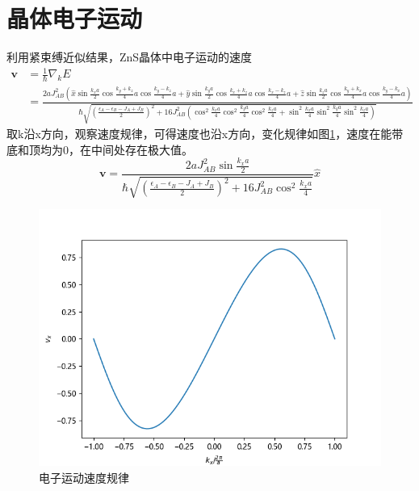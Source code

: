 \documentclass{article}
\begin{document}
\section{晶体电子运动}


利用紧束缚近似结果，ZnS晶体中电子运动的速度
\begin{equation}
	\begin{aligned}
		\boldsymbol{v}&=\frac{1}{\hbar}\nabla_kE\\
		&=\frac{2aJ_{AB}^2(\hat{x}\sin\frac{k_xa}{2}\cos\frac{k_y+k_z}{4}a\cos\frac{k_y-k_z}{4}a + \hat{y}\sin\frac{k_ya}{2}\cos\frac{k_x+k_z}{4}a\cos\frac{k_x-k_z}{4}a + \hat{z}\sin\frac{k_za}{2}\cos\frac{k_y+k_x}{4}a\cos\frac{k_y-k_x}{4}a )} {\hbar \sqrt{(\frac{\epsilon_A-\epsilon_B-J_A+J_B}{2})^2+16J_{AB}^2(\cos^2\frac{k_xa}{4}\cos^2\frac{k_ya}{4}\cos^2\frac{k_za}{4}+\sin^2\frac{k_xa}{4}\sin^2\frac{k_ya}{4}\sin^2\frac{k_za}{4})}}
	\end{aligned}
\end{equation}
取k沿x方向，观察速度规律，可得速度也沿x方向，变化规律如图\ref{fig:9}，速度在能带底和顶均为0，在中间处存在极大值。
\begin{equation}
	\boldsymbol{v}=\frac{2aJ_{AB}^2\sin\frac{k_xa}{2}} {\hbar \sqrt{(\frac{\epsilon_A-\epsilon_B-J_A+J_B}{2})^2+16J_{AB}^2\cos^2\frac{k_xa}{4}}}\hat{x}
\end{equation}
	\begin{figure}[!h]
	\centering
	\includegraphics[scale=1]{v}
	\caption{\heiti{}电子运动速度规律}
	\label{fig:9}
\end{figure}
\end{document}
